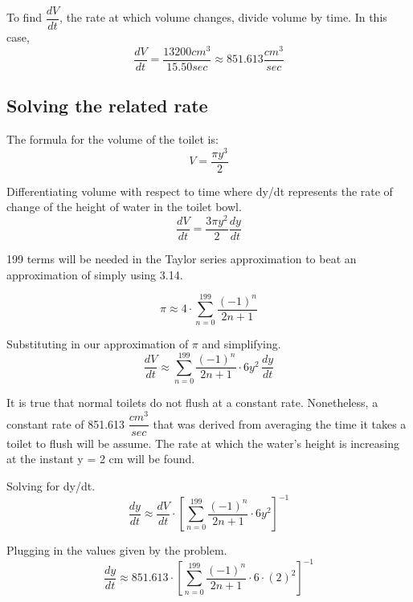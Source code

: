 \documentclass[12pt, titlepage]{article}
\begin{document}
To find \(\dfrac{dV}{dt}\), the rate at which volume changes, divide volume by time. In this case,
\begin{equation*}
  \dfrac{dV}{dt} = \dfrac{13200 cm^{3}}{15.50 sec} \approx 851.613 \dfrac{cm^{3}}{sec}
\end{equation*}

\subsection{Solving the related rate}
The formula for the volume of the toilet is:
\begin{equation*}
    V = \frac{\pi y^3}{2}
\end{equation*}

Differentiating volume with respect to time where dy/dt represents the rate of change of the height of water in the toilet bowl.
\begin{equation*}
  \frac{dV}{dt} = \frac{3 \pi y^2}{2} \frac{dy}{dt}
\end{equation*}

199 terms will be needed in the Taylor series approximation to beat an approximation of simply using 3.14.

\begin{equation*}
  \pi \approx 4 \cdot \sum_{n=0}^{199}{\frac{(-1)^n}{2n+1}}
\end{equation*}

Substituting in our approximation of \(\pi\) and simplifying.
\begin{equation*}
  \frac{dV}{dt} \approx \sum_{n=0}^{199}{\frac{(-1)^n}{2n+1}}  \cdot 6y^{2} \,\frac{dy}{dt}
\end{equation*}

It is true that normal toilets do not flush at a constant rate. Nonetheless,  a constant rate of 851.613 \(\dfrac{cm^{3}}{sec}\) that was derived from averaging the time it takes a toilet to flush will be assume. The rate at which the water's height is increasing at the instant y = 2 cm will be found.

Solving for dy/dt.
\begin{equation*}
  \frac{dy}{dt} \approx \frac{dV}{dt} \cdot [\sum_{n=0}^{199}{ \frac{(-1)^n}{2n+1} }  \cdot 6y^{2}]^{-1}
\end{equation*}

Plugging in the values given by the problem.
\begin{equation*}
  \frac{dy}{dt} \approx 851.613 \cdot  [\sum_{n=0}^{199}{ \frac{(-1)^n}{2n+1} }  \cdot 6 \cdot (2)^{2}]^{-1}
\end{equation*}
\end{document}
